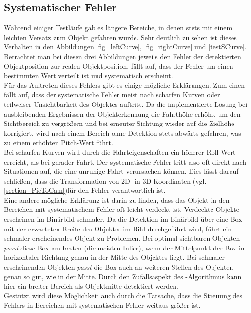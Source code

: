 \subsection{Systematischer Fehler}
\label{sec_sysError}
Während einiger Testläufe gab es längere Bereiche, in denen stets mit einem leichten Versatz zum Objekt gefahren wurde. Sehr deutlich zu sehen ist dieses Verhalten in den Abbildungen \ref{fig_leftCurve}, \ref{fig_rightCurve} und \ref{testSCurve}. Betrachtet man bei diesen drei Abbildungen jeweils den Fehler der detektierten Objektposition zur realen Objektposition, fällt auf, dass der Fehler um einen bestimmten Wert verteilt ist und systematisch erscheint.\\
Für das Auftreten dieses Fehlers gibt es einige mögliche Erklärungen.
Zum einen fällt auf, dass der systematische Fehler meist nach scharfen Kurven oder teilweiser Unsichtbarkeit des Objektes auftritt. Da die implementierte Lösung bei ausbleibenden Ergebnissen der Objekterkennung die Fahrthöhe erhöht, um den Sichtbereich zu vergrößern und bei erneuter Sichtung wieder auf die Zielhöhe korrigiert, wird nach einem Bereich ohne Detektion stets abwärts gefahren, was zu einem erhöhten Pitch-Wert führt.\\
Bei scharfen Kurven wird durch die Fahrteigenschaften ein höherer Roll-Wert erreicht, als bei gerader Fahrt.
Der systematische Fehler tritt also oft direkt nach Situationen auf, die eine unruhige Fahrt verursachen können. Dies lässt darauf schließen, dass die Transformation von 2D- in 3D-Koordinaten (vgl. \ref{section_PicToCam})für den Fehler verantwortlich ist.\\
Eine andere mögliche Erklärung ist darin zu finden, dass das Objekt in den Bereichen mit systematischem Fehler oft leicht verdeckt ist. Verdeckte Objekte erscheinen im Binärbild schmaler. Da die Detektion im Binärbild über eine Box mit der erwarteten Breite des Objektes im Bild durchgeführt wird, führt ein schmaler erscheinendes Objekt zu Problemen. Bei optimal sichtbaren Objekten \textit{passt} diese Box am besten (die meisten Inlier), wenn der Mittelpunkt der Box in horizontaler Richtung genau in der Mitte des Objektes liegt. Bei schmaler erscheinenden Objekten \textit{passt} die Box auch an weiteren Stellen des Objekten genau so gut, wie in der Mitte. Durch den Zufallsaspekt des \rans -Algorithmus kann hier ein breiter Bereich als Objektmitte detektiert werden.\\
Gestützt wird diese Möglichkeit auch durch die Tatsache, dass die Streuung des Fehlers in Bereichen mit systematischen Fehler weitaus größer ist.
